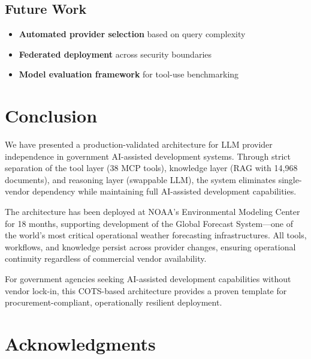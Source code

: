 \documentclass[11pt,twocolumn]{article}
\begin{document}
\subsection{Future Work}

\begin{itemize}
    \item \textbf{Automated provider selection} based on query complexity
    \item \textbf{Federated deployment} across security boundaries
    \item \textbf{Model evaluation framework} for tool-use benchmarking
\end{itemize}

\section{Conclusion}

We have presented a production-validated architecture for LLM provider independence in government AI-assisted development systems. Through strict separation of the tool layer (38 MCP tools), knowledge layer (RAG with 14,968 documents), and reasoning layer (swappable LLM), the system eliminates single-vendor dependency while maintaining full AI-assisted development capabilities.

The architecture has been deployed at NOAA's Environmental Modeling Center for 18 months, supporting development of the Global Forecast System—one of the world's most critical operational weather forecasting infrastructures. All tools, workflows, and knowledge persist across provider changes, ensuring operational continuity regardless of commercial vendor availability.

For government agencies seeking AI-assisted development capabilities without vendor lock-in, this COTS-based architecture provides a proven template for procurement-compliant, operationally resilient deployment.

\section*{Acknowledgments}
\end{document}
